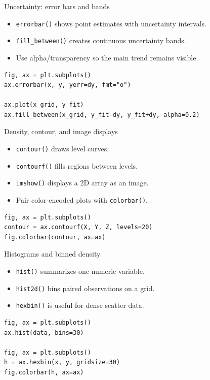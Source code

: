 \documentclass[aspectratio=43,11pt]{beamer}
\begin{document}
\begin{frame}[fragile]{Uncertainty: error bars and bands}
\begin{itemize}
  \item \texttt{errorbar()} shows point estimates with uncertainty intervals.
  \item \texttt{fill\_between()} creates continuous uncertainty bands.
  \item Use alpha/transparency so the main trend remains visible.
\end{itemize}

\begin{lstlisting}
fig, ax = plt.subplots()
ax.errorbar(x, y, yerr=dy, fmt="o")

ax.plot(x_grid, y_fit)
ax.fill_between(x_grid, y_fit-dy, y_fit+dy, alpha=0.2)
\end{lstlisting}
\end{frame}

\begin{frame}[fragile]{Density, contour, and image displays}
\begin{itemize}
  \item \texttt{contour()} draws level curves.
  \item \texttt{contourf()} fills regions between levels.
  \item \texttt{imshow()} displays a 2D array as an image.
  \item Pair color-encoded plots with \texttt{colorbar()}.
\end{itemize}

\begin{lstlisting}
fig, ax = plt.subplots()
contour = ax.contourf(X, Y, Z, levels=20)
fig.colorbar(contour, ax=ax)
\end{lstlisting}
\end{frame}

\begin{frame}[fragile]{Histograms and binned density}
\begin{itemize}
  \item \texttt{hist()} summarizes one numeric variable.
  \item \texttt{hist2d()} bins paired observations on a grid.
  \item \texttt{hexbin()} is useful for dense scatter data.
\end{itemize}

\begin{lstlisting}
fig, ax = plt.subplots()
ax.hist(data, bins=30)

fig, ax = plt.subplots()
h = ax.hexbin(x, y, gridsize=30)
fig.colorbar(h, ax=ax)
\end{lstlisting}
\end{frame}
\end{document}
